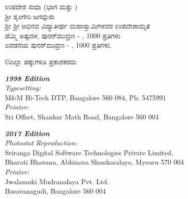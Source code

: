 \begin{center}
ಉಪದೇಶ ಸುಧಾ (ಭಾಗ {} ಮತ್ತು {})\\
ಶ್ರೀ ಶೃಂಗೇರಿ ಜಗದ್ಗುರು\\
ಶ್ರೀ ಶ್ರೀ ಅಭಿನವ ವಿದ್ಯಾತೀರ್ಥ ಮಹಾಸ್ವಾಮಿಗಳವರ ಉಪದೇಶಾಮೃತ\\
ಡೆಮ್ಮಿ ಅಷ್ಟದಳ, ಪುನರ್​ಮುದ್ರಣ - {, 1000}  ಪ್ರತಿಗಳು\\ 
ಎರಡನೆಯ ಪುನರ್​ಮುದ್ರಣ - {, 1000}  ಪ್ರತಿಗಳು. 
\end{center}
\vfill

\noindent
{\eng\copyright}ಎಲ್ಲಾ ಹಕ್ಕುಗಳೂ ಪ್ರಕಾಶಕರದು
\vfill

\noindent
\bgroup
{\sl\eng\bfseries 1998 Edition}\\
{\sl\eng Typesetting:}\\
{\eng M\&M Hi-Tech DTP, Bangalore 560 084, Ph: 5475991}\\
{\sl\eng Printer:}\\
{\eng Sri Offset, Shankar Math Road, Bangalore 560 004}
\bigskip

\noindent
{\sl\eng\bfseries 2017 Edition}\\
{\sl\eng Photostat Reproduction:}\\
{\eng Sriranga Digital Software Technologies Private Limited,\\ 
Bharati Bhavana, Abhinava Shankaralaya, Mysuru 570 004}\\
{\sl\eng Printer:}\\
{\eng Jwalamuki Mudranalaya Pvt. Ltd.\\
Basavanagudi, Bangalore 560 004}
